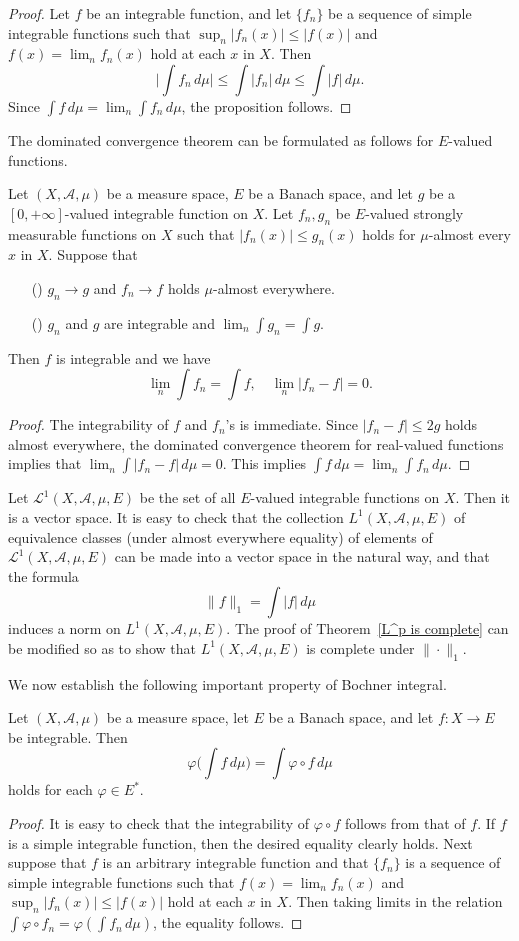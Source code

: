 \begin{proof}
Let $f$ be an integrable function, and let $\{f_n\}$ be a sequence of simple
integrable functions such that $\sup_n|f_n(x)|\leq|f(x)|$ and $f(x)=\lim_nf_n(x)$ hold at each $x$ in $X$. Then
\[\Big|\int f_n\,d\mu\Big|\leq\int|f_n|\,d\mu\leq\int|f|\,d\mu.\]
Since $\int f\,d\mu=\lim_n\int f_n\,d\mu$, the proposition follows.
\end{proof}
The dominated convergence theorem can be formulated as follows for $E$-valued functions.
\begin{theorem}
Let $(X,\mathcal{A},\mu)$ be a measure space, $E$ be a Banach space, and let $g$ be a $[0,+\infty]$-valued integrable function on $X$. Let $f_n,g_n$ be $E$-valued strongly measurable functions on $X$ such that $|f_n(x)|\leq g_n(x)$ holds for $\mu$-almost every $x$ in $X$. Suppose that
\begin{itemize}
\item[(\rmnum{1})] $g_n\to g$ and $f_n\to f$ holds $\mu$-almost everywhere.
\item[(\rmnum{2})] $g_n$ and $g$ are integrable and $\lim_n\int g_n=\int g$.
\end{itemize}
Then $f$ is integrable and we have
\[\lim_n\int f_n=\int f,\quad \lim_n|f_n-f|=0.\]
\end{theorem}
\begin{proof}
The integrability of $f$ and $f_n$'s is immediate. Since $|f_n-f|\leq 2g$ holds almost everywhere, the dominated convergence theorem for real-valued functions implies that $\lim_n\int|f_n-f|\,d\mu=0$. This implies $\int f\,d\mu=\lim_n\int f_n\,d\mu$.
\end{proof}
Let $\mathscr{L}^1(X,\mathcal{A},\mu,E)$ be the set of all $E$-valued integrable functions on $X$. Then it is a vector space. It is easy to check that the collection $L^1(X,\mathcal{A},\mu,E)$ of equivalence classes (under almost everywhere equality) of elements of $\mathscr{L}^1(X,\mathcal{A},\mu,E)$ can be made into a vector space in the natural way, and that the formula
\[\|f\|_1=\int|f|\,d\mu\]
induces a norm on $L^1(X,\mathcal{A},\mu,E)$. The proof of Theorem~\ref{L^p is complete} can be modified so as to show that $L^1(X,\mathcal{A},\mu,E)$ is complete under $\|\cdot\|_1$.\par
We now establish the following important property of Bochner integral.
\begin{proposition}
Let $(X,\mathcal{A},\mu)$ be a measure space, let $E$ be a Banach space, and let $f:X\to E$ be integrable. Then
\[\varphi\Big(\int f\,d\mu\Big)=\int\varphi\circ f\,d\mu\]
holds for each $\varphi\in E^*$.
\end{proposition}
\begin{proof}
It is easy to check that the integrability of $\varphi\circ f$ follows from that of $f$. If $f$ is a simple integrable function, then the desired equality clearly holds. Next suppose that $f$ is an arbitrary integrable function and that $\{f_n\}$ is a sequence of simple integrable functions such that $f(x)=\lim_nf_n(x)$ and $\sup_n|f_n(x)|\leq|f(x)|$ hold at each $x$ in $X$. Then taking limits in the relation $\int\varphi\circ f_n=\varphi(\int f_n \,d\mu)$, the equality follows.
\end{proof}
